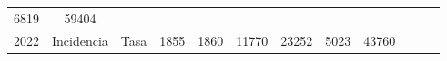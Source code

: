 \begin{tabular}{ccc|cccccc|lll}
		\multicolumn{1}{c|}{\cellcolor[HTML]{C1EFC0}6819} &
		\cellcolor[HTML]{C1EFC0}59404 &
		&
		&
		\\ \cline{3-9}
		\multicolumn{1}{|c|}{\multirow{-5}{*}{\cellcolor[HTML]{C1EFC0}2022}} &
		\multicolumn{1}{c|}{\cellcolor[HTML]{C1EFC0}Incidencia} &
		\cellcolor[HTML]{C1EFC0}Tasa &
		\multicolumn{1}{c|}{\cellcolor[HTML]{C1EFC0}1855} &
		\multicolumn{1}{c|}{\cellcolor[HTML]{C1EFC0}1860} &
		\multicolumn{1}{c|}{\cellcolor[HTML]{C1EFC0}11770} &
		\multicolumn{1}{c|}{\cellcolor[HTML]{C1EFC0}23252} &
		\multicolumn{1}{c|}{\cellcolor[HTML]{C1EFC0}5023} &
		\cellcolor[HTML]{C1EFC0}43760 &
		&
		&
		\\ \cline{1-1} \cline{3-9}
	\end{tabular}